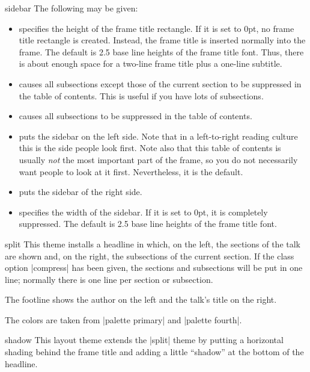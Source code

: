 \begin{outerthemeexample}{sidebar}
  The following  may be given:
  \begin{itemize}
  \item
     specifies the height of the
    frame title rectangle. If it is set to 0pt, no frame title
    rectangle is created. Instead, the frame title is inserted
    normally into the frame. The default is 2.5 base line heights of
    the frame title font. Thus, there is about enough space for a
    two-line frame title plus a one-line subtitle.
  \item
     causes all subsections except
    those of the current section to be suppressed in the table of
    contents. This is useful if you have lots of subsections.
  \item
     causes all subsections to be
    suppressed in the table of contents.
  \item
     puts the sidebar on the left side. Note that in a
    left-to-right reading culture this is the side people look first. Note
    also that this table of contents is usually \emph{not} the most
    important part of the frame, so you do not necessarily want people
    to look at it first. Nevertheless, it is the default.
  \item
     puts the sidebar of the right side.
  \item
     specifies the width of the
    sidebar. If it is set to 0pt, it is completely suppressed. The
    default is 2.5 base line heights of the frame title font.
  \end{itemize}
\end{outerthemeexample}

\begin{outerthemeexample}{split}
  This theme installs a headline in which, on the left, the sections
  of the talk are shown and, on the right, the subsections of the
  current section. If the class option |compress| has been given,
  the sections and subsections will be put in one line; normally there
  is one line per section or subsection.

  The footline shows the author on the left and the talk's title on
  the right.

  The colors are taken from |palette primary| and |palette fourth|.
\end{outerthemeexample}

\begin{outerthemeexample}{shadow}
  This layout theme extends the |split| theme by putting a horizontal
  shading behind the frame title and adding a little ``shadow'' at the
  bottom of the headline.
\end{outerthemeexample}

